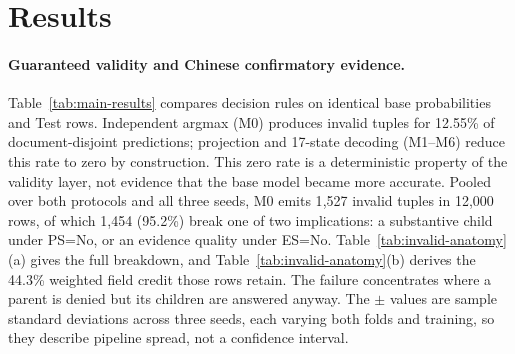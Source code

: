 \section{Results}
\label{sec:results}

\begin{table}[t]
  \centering
  \small
  \caption{Chinese paired contrasts on the two pre-specified metrics, with
  uncorrected 95\% report-cluster bootstrap intervals and Holm-adjusted
  $p$-values.}
  \label{tab:contrasts}
  \begingroup
  \setlength{\tabcolsep}{2.6pt}
  
  \endgroup
\end{table}

\begin{table}[t]
  \centering
  \small
  \caption{\protect}
  \label{tab:multilingual}
  \begingroup
  \small
  \setlength{\tabcolsep}{2.5pt}
  
  \endgroup
\end{table}

\begin{table}[t]
  \centering
  \small
  \caption{\protect}
  \label{tab:invalid-anatomy}
  \begingroup
  \small
  \setlength{\tabcolsep}{3pt}
  
  \endgroup
\end{table}

\paragraph{Guaranteed validity and Chinese confirmatory evidence.}
Table~\ref{tab:main-results} compares decision rules on identical base
probabilities and Test rows. Independent argmax (M0) produces invalid tuples
for 12.55\% of document-disjoint predictions; projection and 17-state decoding
(M1--M6) reduce this rate to zero by construction. This zero rate is a
deterministic property of the validity layer, not evidence that the base model
became more accurate. Pooled over both protocols and all three seeds, M0 emits
1{,}527 invalid tuples in 12{,}000 rows, of which 1{,}454 (95.2\%) break one
of two implications: a substantive child under \textsf{PS}=No, or an evidence
quality under \textsf{ES}=No. Table~\ref{tab:invalid-anatomy}(a) gives the
full breakdown, and Table~\ref{tab:invalid-anatomy}(b) derives the 44.3\%
weighted field credit those rows retain. The failure concentrates where a
parent is denied but its children are answered anyway. The $\pm$ values are sample standard deviations across
three seeds, each varying both folds and training, so they describe pipeline
spread, not a confidence interval.

